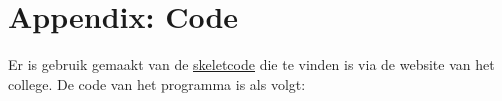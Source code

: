 \documentclass[10pt]{article}
\begin{document}
\section*{Appendix: Code}

Er is gebruik gemaakt van de \href{http://www.liacs.leidenuniv.nl/~kosterswa/AI/iets.cc}{\underline{skeletcode}} die te vinden is via
de website van het college.
De code van het programma is als volgt:

\smallskip


\end{document}
